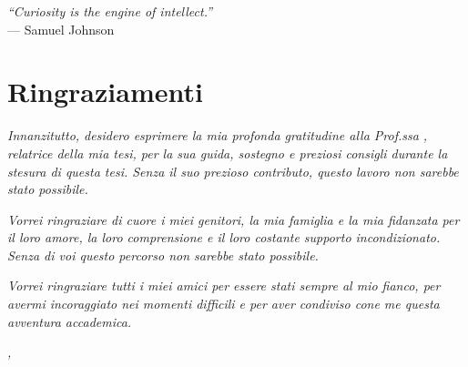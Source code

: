 \cleardoublepage{}

\begin{flushright}{
    \slshape
    ``Curiosity is the engine of intellect.''} \\
    \medskip
    --- Samuel Johnson
\end{flushright}


\bigskip

\begingroup
\let\clearpage\relax
\let\cleardoublepage\relax
\let\cleardoublepage\relax

\chapter*{Ringraziamenti}

\noindent \textit{Innanzitutto, desidero esprimere la mia profonda gratitudine alla Prof.ssa \myProf, relatrice della mia tesi, per la sua guida, sostegno e preziosi consigli durante la stesura di questa tesi. Senza il suo prezioso contributo, questo lavoro non sarebbe stato possibile.\\}

\noindent \textit{Vorrei ringraziare di cuore i miei genitori, la mia famiglia e la mia fidanzata per il loro amore, la loro comprensione e il loro costante supporto incondizionato. Senza di voi questo percorso non sarebbe stato possibile.\\}

\noindent \textit{Vorrei ringraziare tutti i miei amici per essere stati sempre al mio fianco, per avermi incoraggiato nei momenti difficili e per aver condiviso cone me questa avventura accademica.\\}



\bigskip

\noindent\textit{\myLocation, \myTime}
\hfill \myName\endgroup
